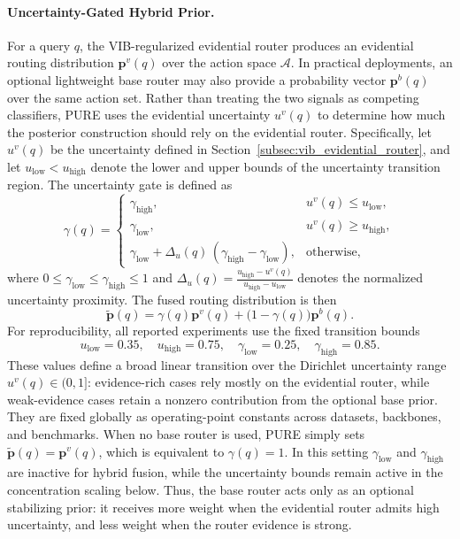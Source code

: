 \documentclass[a4paper,fleqn]{cas-dc}
\begin{document}
\paragraph{Uncertainty-Gated Hybrid Prior.}
For a query $q$, the VIB-regularized evidential router produces an evidential routing distribution $\mathbf{p}^v(q)$ over the action space $\mathcal{A}$. In practical deployments, an optional lightweight base router may also provide a probability vector $\mathbf{p}^b(q)$ over the same action set. Rather than treating the two signals as competing classifiers, PURE uses the evidential uncertainty $u^v(q)$ to determine how much the posterior construction should rely on the evidential router. Specifically, let $u^v(q)$ be the uncertainty defined in Section~\ref{subsec:vib_evidential_router}, and let $u_{\mathrm{low}}<u_{\mathrm{high}}$ denote the lower and upper bounds of the uncertainty transition region. The uncertainty gate is defined as
\begin{equation}
\label{eq:uncertainty_gate}
\gamma(q)=
\begin{cases}
\gamma_{\mathrm{high}}, & u^v(q)\le u_{\mathrm{low}},\\[4pt]
\gamma_{\mathrm{low}}, & u^v(q)\ge u_{\mathrm{high}},\\[4pt]
\gamma_{\mathrm{low}}+
\Delta_u(q)\,(\gamma_{\mathrm{high}}-\gamma_{\mathrm{low}}),
& \mathrm{otherwise},
\end{cases}
\end{equation}
where $0\le \gamma_{\mathrm{low}}\le \gamma_{\mathrm{high}}\le 1$ and $\Delta_u(q)=\frac{u_{\mathrm{high}}-u^v(q)}{u_{\mathrm{high}}-u_{\mathrm{low}}}$ denotes the normalized uncertainty proximity. The fused routing distribution is then
\begin{equation}
\label{eq:hybrid_distribution}
\tilde{\mathbf{p}}(q)
=
\gamma(q)\mathbf{p}^v(q)
+
\big(1-\gamma(q)\big)\mathbf{p}^b(q).
\end{equation}
For reproducibility, all reported experiments use the fixed transition bounds
\[
u_{\mathrm{low}}=0.35,\quad
u_{\mathrm{high}}=0.75,\quad
\gamma_{\mathrm{low}}=0.25,\quad
\gamma_{\mathrm{high}}=0.85 .
\]
These values define a broad linear transition over the Dirichlet uncertainty range $u^v(q)\in(0,1]$: evidence-rich cases rely mostly on the evidential router, while weak-evidence cases retain a nonzero contribution from the optional base prior. 
They are fixed globally as operating-point constants across datasets, backbones, and benchmarks. 
When no base router is used, PURE simply sets $\tilde{\mathbf{p}}(q)=\mathbf{p}^v(q)$, which is equivalent to $\gamma(q)=1$. In this setting $\gamma_{\mathrm{low}}$ and $\gamma_{\mathrm{high}}$ are inactive for hybrid fusion, while the uncertainty bounds remain active in the concentration scaling below. Thus, the base router acts only as an optional stabilizing prior: it receives more weight when the evidential router admits high uncertainty, and less weight when the router evidence is strong.
\end{document}

